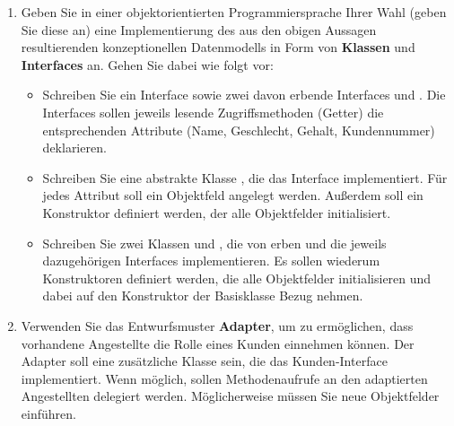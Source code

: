 \documentclass{bschlangaul-aufgabe}
\begin{document}
\begin{enumerate}


\item Geben Sie in einer objektorientierten Programmiersprache Ihrer
Wahl (geben Sie diese an) eine Implementierung des aus den obigen
Aussagen resultierenden konzeptionellen Datenmodells in Form von
\textbf{Klassen} und \textbf{Interfaces} an. Gehen Sie dabei wie folgt
vor:

\begin{itemize}
\item Schreiben Sie ein Interface 
sowie zwei davon erbende Interfaces  und
. Die Interfaces sollen jeweils lesende
Zugriffsmethoden (Getter) die entsprechenden Attribute (Name,
Geschlecht, Gehalt, Kundennummer) deklarieren.

\begin{bAntwort}
\end{bAntwort}

\item Schreiben Sie eine abstrakte Klasse
, die das Interface 
implementiert. Für jedes Attribut soll ein Objektfeld angelegt werden.
Außerdem soll ein Konstruktor definiert werden, der alle Objektfelder
initialisiert.

\begin{bAntwort}
\end{bAntwort}

\item Schreiben Sie zwei Klassen  und
, die von  erben und die
jeweils dazugehörigen Interfaces implementieren. Es sollen wiederum
Konstruktoren definiert werden, die alle Objektfelder initialisieren und
dabei auf den Konstruktor der Basisklasse  Bezug
nehmen.

\begin{bAntwort}
\end{bAntwort}
\end{itemize}


\item Verwenden Sie das Entwurfsmuster \textbf{Adapter}, um zu
ermöglichen, dass vorhandene Angestellte die Rolle eines Kunden
einnehmen können. Der Adapter soll eine zusätzliche Klasse sein, die das
Kunden-Interface implementiert. Wenn möglich, sollen Methodenaufrufe an
den adaptierten Angestellten delegiert werden. Möglicherweise müssen Sie
neue Objektfelder einführen.


\end{enumerate}
\end{document}
